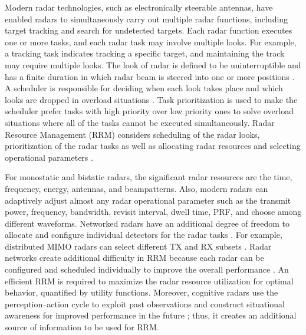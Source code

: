 \documentclass[english, 12pt, a4paper, elec, utf8, a-1b, online]{aaltothesis}
\numberwithin{equation}{section}
\begin{document}
Modern radar technologies, such as electronically steerable antennas, have enabled radars to simultaneously carry out multiple radar functions, including target tracking and search for undetected targets.
Each radar function executes one or more tasks, and each radar task may involve multiple looks.
For example, a tracking task indicates tracking a specific target, and maintaining the track may require multiple looks.
The look of radar is defined to be uninterruptible and has a finite duration in which radar beam is steered into one or more positions \cite{Moo2016}.
A scheduler is responsible for deciding when each look takes place and which looks are dropped in overload situations \cite{Moo2016}. 
Task prioritization is used to make the scheduler prefer tasks with high priority over low priority ones to solve overload situations where all of the tasks cannot be executed simultaneously.
Radar Resource Management (RRM) considers scheduling of the radar looks, prioritization of the radar tasks as well as allocating radar resources and selecting operational parameters \cite{Moo2016}. 

For monostatic and bistatic radars, the significant radar resources are the time, frequency, energy, antennas, and beampatterns. 
Also, modern radars can adaptively adjust almost any radar operational parameter such as the transmit power, frequency, bandwidth, revisit interval, dwell time, PRF, and choose among different waveforms.
Networked radars have an additional degree of freedom to allocate and configure individual detectors for the radar tasks \cite{Moo2016}. 
For example, distributed MIMO radars can select different TX and RX subsets \cite{Godrich2011a, Godrich2011, Sun2014}.
Radar networks create additional difficulty in RRM because each radar can be configured and scheduled individually to improve the overall performance \cite{Sun2014}.
An efficient RRM is required to maximize the radar resource utilization for optimal behavior, quantified by utility functions. 
Moreover, cognitive radars use the perception--action cycle to exploit past observations and construct situational awareness for improved performance in the future \cite{Haykin2006}; thus, it creates an additional source of information to be used for RRM.
\end{document}
